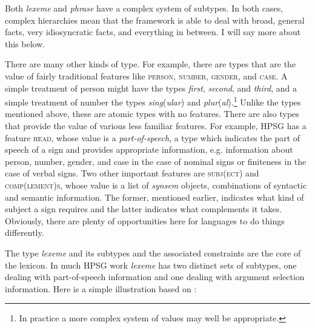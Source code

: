 \documentclass[output=paper]{langsci/langscibook}
\begin{document}
\ea\label{ex-5:borsley:1}
\z
%
Both \emph{lexeme}   and \emph{phrase} have a complex system of subtypes.
In both cases, complex hierarchies mean that the framework is able to deal with
broad, general facts, very idiosyncratic facts, and everything in between. I
will say more about this below.

There are many other kinds of type. For example, there are types that are the
value of fairly traditional features like \textsc{person}, \textsc{number}, \textsc{gender}, and \textsc{case}. A
simple treatment of person might have the types \emph{first},
\emph{second}, and \emph{third}, and a simple treatment of number the types
\emph{sing}(\emph{ular}) and \emph{plur}(\emph{al}).\footnote{
\textrm{In practice a more complex system of values may well be appropriate.}}
Unlike the types mentioned above, these are atomic types with no features.
There are also types that provide the value of various less familiar features.
For example, \gls{HPSG} has a feature \textsc{head}, whose value is a \emph{part-of-speech},
a type which indicates the part of speech of a sign and provides appropriate
information, e.g. information about person, number, gender, and case in the
case of nominal signs or finiteness in the case of verbal signs. Two other
important features are \textsc{subj(ect)} and \textsc{comp(lement)s}, whose value is a list of
\emph{synsem} objects, combinations of syntactic and semantic information.
The former, mentioned earlier, indicates what kind of subject a sign requires
and the latter indicates what complements it takes. Obviously, there are plenty
of opportunities here for languages to do things differently.

The type \emph{lexeme} and its subtypes and the associated constraints are the
core of the lexicon. In much \gls{HPSG} work \emph{lexeme} has two distinct
sets of subtypes, one dealing with part-of-speech information and one dealing
with argument selection information. Here is a simple illustration based on
\citet[20]{GinSag2000}:
\end{document}
